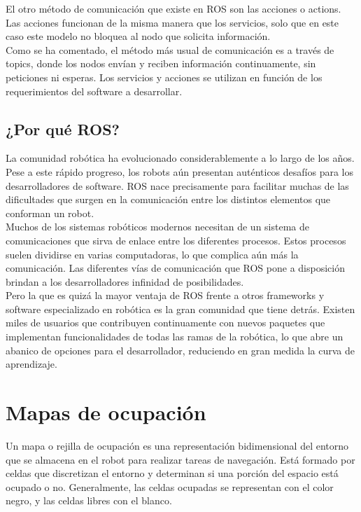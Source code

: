 El otro método de comunicación que existe en ROS son las acciones o actions. Las acciones funcionan de la misma manera que los servicios, solo que en este caso este modelo no bloquea al nodo que solicita información.\\

Como se ha comentado, el método más usual de comunicación es a través de topics, donde los nodos envían y reciben información continuamente, sin peticiones ni esperas. Los servicios y acciones se utilizan en función de los requerimientos del software a desarrollar.\\

\subsection{¿Por qué ROS?}

La comunidad robótica ha evolucionado considerablemente a lo largo de los años. Pese a  este rápido progreso, los robots aún presentan auténticos desafíos para los desarrolladores de software. ROS nace precisamente para facilitar muchas de las dificultades que surgen en la comunicación entre los distintos elementos que conforman un robot.\\

Muchos de los sistemas robóticos modernos necesitan de un sistema de comunicaciones que sirva de enlace entre los diferentes procesos. Estos procesos suelen dividirse en varias computadoras, lo que complica aún más la comunicación. Las diferentes vías de comunicación que ROS pone a disposición brindan a los desarrolladores infinidad de posibilidades.\\

Pero la que es quizá la mayor ventaja de ROS frente a otros frameworks y software especializado en robótica es la gran comunidad que tiene detrás. Existen miles de usuarios que contribuyen continuamente con nuevos paquetes que implementan funcionalidades de todas las ramas de la robótica, lo que abre un abanico de opciones para el desarrollador, reduciendo en gran medida la curva de aprendizaje.\\

\section{Mapas de ocupación}

Un mapa o rejilla de ocupación es una representación bidimensional del entorno que se almacena en el robot para realizar tareas de navegación. Está formado por celdas que discretizan el entorno y determinan si una porción del espacio está ocupado o no. Generalmente, las celdas ocupadas se representan con el color negro, y las celdas libres con el blanco.\\

